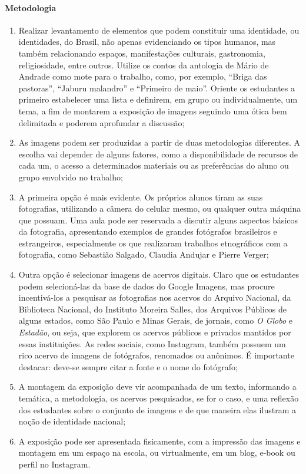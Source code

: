\documentclass[12pt]{extarticle}
\begin{document}
\paragraph{Metodologia} 
\begin{enumerate}
\item
Realizar levantamento de elementos que podem
constituir uma identidade, ou identidades, do Brasil, não apenas
evidenciando os tipos humanos, mas também relacionando espaços,
manifestações culturais, gastronomia, religiosidade, entre outros.
Utilize os contos da antologia de Mário de Andrade como mote para o
trabalho, como, por exemplo, ``Briga das pastoras'', ``Jaburu malandro''
e ``Primeiro de maio''. Oriente os estudantes a primeiro estabelecer uma
lista e definirem, em grupo ou individualmente, um tema, a fim de
montarem a exposição de imagens seguindo uma ótica bem delimitada e
poderem aprofundar a discussão;

\item As imagens podem ser produzidas a partir de duas metodologias
diferentes. A escolha vai depender de alguns fatores, como a
disponibilidade de recursos de cada um, o acesso a determinados
materiais ou as preferências do aluno ou grupo envolvido no trabalho;

\item A primeira opção é mais evidente. Os próprios alunos tiram as suas
fotografias, utilizando a câmera do celular mesmo, ou qualquer outra
máquina que possuam. Uma aula pode ser reservada a discutir alguns
aspectos básicos da fotografia, apresentando exemplos de grandes
fotógrafos brasileiros e estrangeiros, especialmente os que realizaram
trabalhos etnográficos com a fotografia, como Sebastião Salgado, Claudia
Andujar e Pierre Verger;

\item Outra opção é selecionar imagens de acervos digitais. Claro que os
estudantes podem selecioná-las da base de dados do Google Imagens, mas
procure incentivá-los a pesquisar as fotografias nos acervos do Arquivo
Nacional, da Biblioteca Nacional, do Instituto Moreira Salles, dos
Arquivos Públicos de alguns estados, como São Paulo e Minas Gerais, de
jornais, como \emph{O Globo} e \emph{Estadão}, ou seja, que explorem os
acervos públicos e privados mantidos por essas instituições. As redes
sociais, como Instagram, também possuem um rico acervo de imagens de
fotógrafos, renomados ou anônimos. É importante destacar: deve-se sempre
citar a fonte e o nome do fotógrafo;

\item A montagem da exposição deve vir acompanhada de um texto, informando
a temática, a metodologia, os acervos pesquisados, se for o caso, e uma
reflexão dos estudantes sobre o conjunto de imagens e de que maneira
elas ilustram a noção de identidade nacional;

\item A exposição pode ser apresentada fisicamente, com a impressão das
imagens e montagem em um espaço na escola, ou virtualmente, em um blog,
e-book ou perfil no Instagram.
\end{enumerate}
\end{document}
